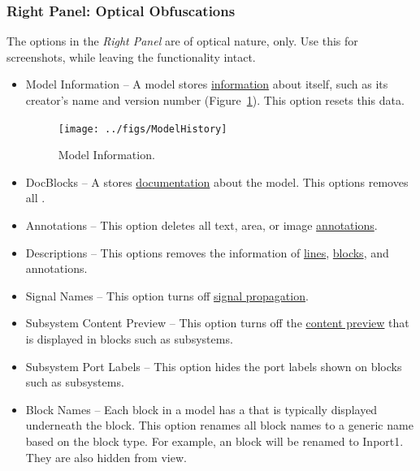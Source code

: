 \documentclass{article}
\begin{document}
\subsubsection{Right Panel: Optical Obfuscations}
\label{lbl:rightside}
The options in the \emph{Right Panel} are of optical nature, only. Use this for screenshots, while leaving the functionality intact.

\begin{itemize}
	\item Model Information -- A \Simulink model stores \href{https://www.mathworks.com/help/simulink/ug/managing-model-versions.html}{information} about itself, such as its creator's name and version number (Figure~\ref{fig:model_history}). This option resets this data.
\begin{figure}[htb]
	\centering
	\texttt{[image: ../figs/ModelHistory]}
	\caption{Model Information.}
	\label{fig:model_history}
\end{figure}
	
	\item DocBlocks -- A \docblock stores \href{https://www.mathworks.com/help/simulink/slref/docblock.html}{documentation} about the model. This options removes all .
	
	\item Annotations -- This option deletes all text, area, or image \href{https://www.mathworks.com/help/simulink/ug/annotations.html}{annotations}.

	\item Descriptions -- This options removes the  information of \href{https://www.mathworks.com/help/simulink/ug/signal-basics.html#bs9gzwp}{lines}, \href{https://www.mathworks.com/help/simulink/ug/block-properties-dialog-box.html}{blocks}, and annotations. 

	\item Signal Names -- This option turns off \href{https://www.mathworks.com/help/simulink/ug/signal-label-propagation.html}{signal propagation}.

\item Subsystem Content Preview -- This option turns off the \href{https://www.mathworks.com/help/simulink/ug/preview-content-of-hierarchical-items.html}{content preview} that is displayed in blocks such as subsystems.
	
	\item Subsystem Port Labels -- This option hides the port labels shown on blocks such as subsystems.
	
	\item Block Names -- Each block in a model has a  that is typically displayed underneath the block. This option renames all block names to a generic name based on the block type. For example, an \inport block will be renamed to Inport1. They are also hidden from view.


\end{itemize}
\end{document}
